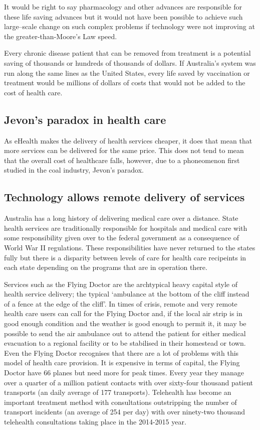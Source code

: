 It would be right to say pharmacology and other advances are responsible for these life saving advances but it would not have been possible to achieve such large--scale change on such complex problems if technology were not improving at the greater-than-Moore's Law speed.

Every chronic disease patient that can be removed from treatment is a potential saving of thousands or hundreds of thousands of dollars. If Australia's system was run along the same lines as the United States, every life saved by vaccination or treatment would be millions of dollars of costs that would not be added to the cost of health care.




\subsection{Jevon's paradox in health care}
As eHealth makes the delivery of health services cheaper, it does that mean that more services can be delivered for the same price. This does not tend to mean that the overall cost of healthcare falls, however, due to a phoneomenon first studied in the coal industry, Jevon's paradox. 



 
\subsection{Technology allows remote delivery of services}
Australia has a long history of delivering medical care over a distance. State health services are traditionally responsible for hospitals and medical care with some responsibility given over to the federal government as a consequence of World War II regulations. 
These responsibilities have never returned to the states fully but there is a disparity between levels of care for health care recipeints in each state depending on the programs that are in operation there.

Services such as the Flying Doctor are the archtypical heavy capital style of health service delivery; the typical `ambulance at the bottom of the cliff instead of a fence at the edge of the cliff'.
In times of crisis, remote and very remote health care users can call for the Flying Doctor and, if the local air strip is in good enough condition and the weather is good enough to permit it, it may be possible to send the air ambulance out to attend the patient for either medical evacuation to a regional facility or to be stabilised in their homestead or town. Even the Flying Doctor recognises that there are a lot of problems with this model of health care provision. It is expensive in terms of capital, the Flying Doctor have 66 planes but need more for peak times. Every year they manage over a quarter of a million patient contacts with over sixty-four thousand patient transports (an daily average of 177 transports). Telehealth has become an important treatment method with consultations outstripping the number of transport incidents (an average of 254 per day) with over ninety-two thousand telehealth consultations taking place in the 2014-2015 year. 

